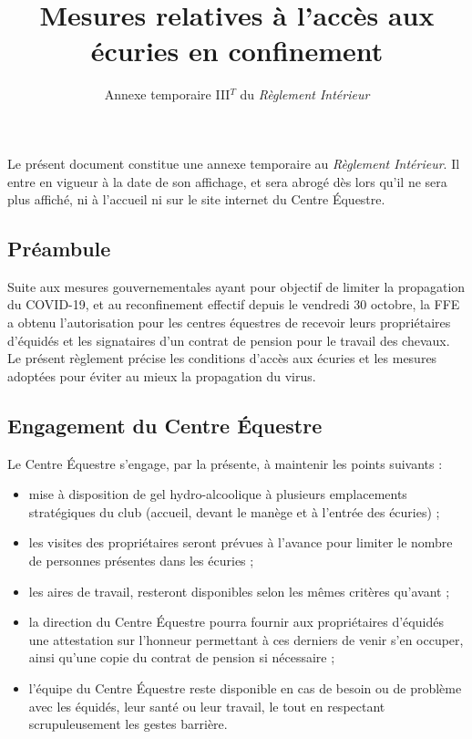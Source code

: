 \documentclass[11pt,a4paper]{article}
\title{Mesures relatives à l'accès aux écuries en confinement}
\subtitle{Annexe temporaire III$^T$ du \textit{Règlement Intérieur}}
\author{}
\date{}
\begin{document}
\maketitle


Le présent document constitue une annexe temporaire au \textit{Règlement Intérieur}. Il entre en vigueur à la date de son affichage, et sera abrogé dès lors qu'il ne sera plus affiché, ni à l'accueil ni sur le site internet du Centre Équestre.

\subsection*{Préambule}
	Suite aux mesures gouvernementales ayant pour objectif de limiter la propagation du COVID-19, et au reconfinement effectif depuis le vendredi 30 octobre, la FFE a obtenu l'autorisation pour les centres équestres de recevoir leurs propriétaires d'équidés et les signataires d'un contrat de pension pour le travail des chevaux. Le présent règlement précise les conditions d'accès aux écuries et les mesures adoptées pour éviter au mieux la propagation du virus.
\subsection*{Engagement du Centre Équestre}
	Le Centre Équestre s'engage, par la présente, à maintenir les points suivants :
	\begin{itemize}
		\item mise à disposition de gel hydro-alcoolique à plusieurs emplacements stratégiques du club (accueil, devant le manège et à l'entrée des écuries) ;
		\item les visites des propriétaires seront prévues à l'avance pour limiter le nombre de personnes présentes dans les écuries ;
		\item les aires de travail, resteront disponibles selon les mêmes critères qu'avant ;
		\item la direction du Centre Équestre pourra fournir aux propriétaires d'équidés une attestation sur l'honneur permettant à ces derniers de venir s'en occuper, ainsi qu'une copie du contrat de pension si nécessaire ;
		\item l'équipe du Centre Équestre reste disponible en cas de besoin ou de problème avec les équidés, leur santé ou leur travail, le tout en respectant scrupuleusement les gestes barrière.
	\end{itemize}
\end{document}
